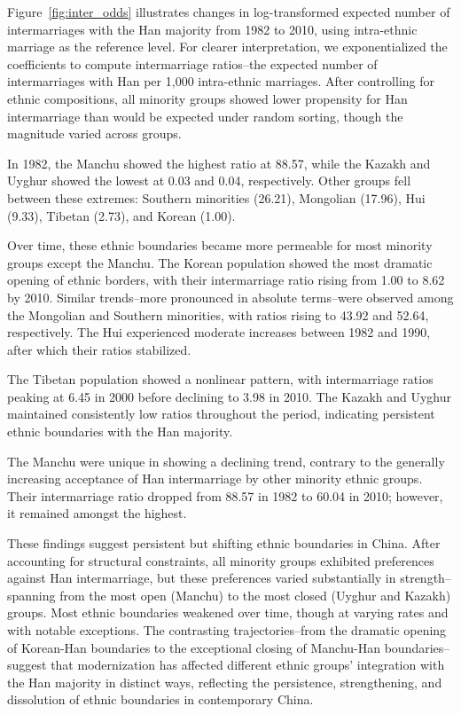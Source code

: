 

Figure~\ref{fig:inter_odds} illustrates changes in log-transformed expected
number of intermarriages with the Han majority from 1982 to 2010, using
intra-ethnic marriage as the reference level.
For clearer interpretation, we exponentialized the coefficients to compute
intermarriage ratios--the expected number of intermarriages with Han per 1,000
intra-ethnic marriages.
After controlling for ethnic compositions, all minority groups showed lower
propensity for Han intermarriage than would be expected under random sorting,
though the magnitude varied across groups.

In 1982, the Manchu showed the highest ratio at 88.57, while the Kazakh and
Uyghur showed the lowest at 0.03 and 0.04, respectively.
Other groups fell between these extremes: Southern minorities (26.21),
Mongolian (17.96), Hui (9.33), Tibetan (2.73), and Korean (1.00).

Over time, these ethnic boundaries became more permeable for most minority
groups except the Manchu.
The Korean population showed the most dramatic opening of ethnic borders, with
their intermarriage ratio rising from 1.00 to 8.62 by 2010.
Similar trends--more pronounced in absolute terms--were observed among the
Mongolian and Southern minorities, with ratios rising to 43.92 and 52.64,
respectively.
The Hui experienced moderate increases between 1982 and 1990, after which their
ratios stabilized.

The Tibetan population showed a nonlinear pattern, with intermarriage ratios
peaking at 6.45 in 2000 before declining to 3.98 in 2010.
The Kazakh and Uyghur maintained consistently low ratios throughout the period,
indicating persistent ethnic boundaries with the Han majority.

The Manchu were unique in showing a declining trend, contrary to the generally
increasing acceptance of Han intermarriage by other minority ethnic groups.
Their intermarriage ratio dropped from 88.57 in 1982 to 60.04 in 2010; however,
it remained amongst the highest.

These findings suggest persistent but shifting ethnic boundaries in China.
After accounting for structural constraints, all minority groups exhibited
preferences against Han intermarriage, but these preferences varied
substantially in strength--spanning from the most open (Manchu) to the most
closed (Uyghur and Kazakh) groups.
Most ethnic boundaries weakened over time, though at varying rates and with
notable exceptions.
The contrasting trajectories--from the dramatic opening of Korean-Han boundaries
to the exceptional closing of Manchu-Han boundaries--suggest that modernization
has affected different ethnic groups' integration with the Han majority in
distinct ways, reflecting the persistence, strengthening, and dissolution of
ethnic boundaries in contemporary China.